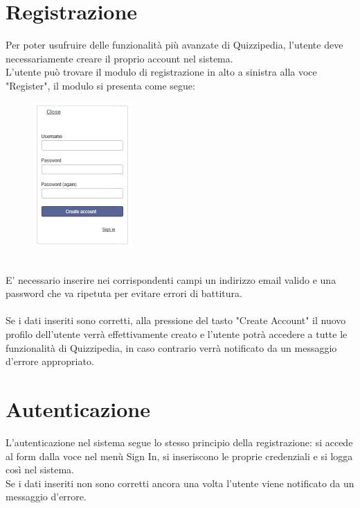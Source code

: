 \documentclass[a4paper,11pt]{article}
\begin{document}
	\section{Registrazione}
	Per poter usufruire delle funzionalità più avanzate di Quizzipedia, l'utente deve necessariamente creare il proprio account nel sistema.\\
	L'utente può trovare il modulo di registrazione in alto a sinistra alla voce "Register", il modulo si presenta come segue:\\
	\begin{figure}[h!]
	\begin{center}
	\includegraphics[scale=0.85]{../images/form.png}
	\end{center}
	\end{figure}	
	\\
	E' necessario inserire nei corrispondenti campi un indirizzo email valido e una password che va ripetuta per evitare errori di battitura.\\ \\
	Se i dati inseriti sono corretti, alla pressione del tasto "Create Account" il nuovo profilo dell'utente verrà effettivamente creato e l'utente potrà accedere a tutte le funzionalità di Quizzipedia, in caso contrario verrà notificato da un messaggio d'errore appropriato.
	\section{Autenticazione}
	L'autenticazione nel sistema segue lo stesso principio della registrazione: si accede al form dalla voce nel menù Sign In, si inseriscono le proprie credenziali e si logga così nel sistema.\\ Se i dati inseriti non sono corretti ancora una volta l'utente viene notificato da un messaggio d'errore. 
	\newpage
\end{document}
